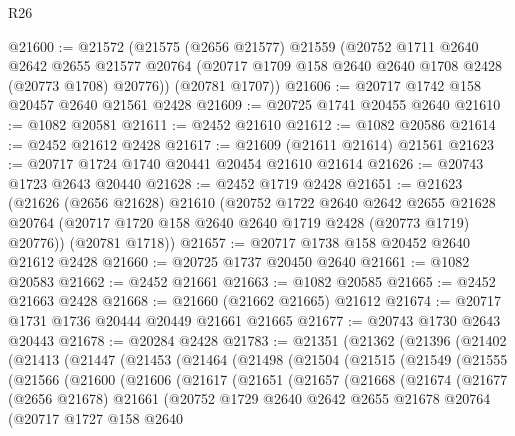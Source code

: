 \begin{lexlean}{R26}
\begin{coremodule}
@21600 := @21572
    (@21575
      (@2656 @21577)
      @21559
      (@20752
        @1711
        @2640
        @2642
        @2655
        @21577
        @20764
        (@20717 @1709 @158 @2640 @2640 @1708 @2428 (@20773 @1708) @20776))
      (@20781 @1707))
@21606 := @20717 @1742 @158 @20457 @2640 @21561 @2428
@21609 := @20725 @1741 @20455 @2640
@21610 := @1082 @20581
@21611 := @2452 @21610
@21612 := @1082 @20586
@21614 := @2452 @21612 @2428
@21617 := @21609 (@21611 @21614) @21561
@21623 := @20717 @1724 @1740 @20441 @20454 @21610 @21614
@21626 := @20743 @1723 @2643 @20440
@21628 := @2452 @1719 @2428
@21651 := @21623
    (@21626
      (@2656 @21628)
      @21610
      (@20752
        @1722
        @2640
        @2642
        @2655
        @21628
        @20764
        (@20717 @1720 @158 @2640 @2640 @1719 @2428 (@20773 @1719) @20776))
      (@20781 @1718))
@21657 := @20717 @1738 @158 @20452 @2640 @21612 @2428
@21660 := @20725 @1737 @20450 @2640
@21661 := @1082 @20583
@21662 := @2452 @21661
@21663 := @1082 @20585
@21665 := @2452 @21663 @2428
@21668 := @21660 (@21662 @21665) @21612
@21674 := @20717 @1731 @1736 @20444 @20449 @21661 @21665
@21677 := @20743 @1730 @2643 @20443
@21678 := @20284 @2428
@21783 := @21351
    (@21362
      (@21396
        (@21402
          (@21413
            (@21447
              (@21453
                (@21464
                  (@21498
                    (@21504
                      (@21515
                        (@21549
                          (@21555
                            (@21566
                              (@21600
                                (@21606
                                  (@21617
                                    (@21651
                                      (@21657
                                        (@21668
                                          (@21674
                                            (@21677
                                              (@2656 @21678)
                                              @21661
                                              (@20752
                                                @1729
                                                @2640
                                                @2642
                                                @2655
                                                @21678
                                                @20764
                                                (@20717
                                                  @1727
                                                  @158
                                                  @2640

\end{coremodule}
\end{lexlean}
